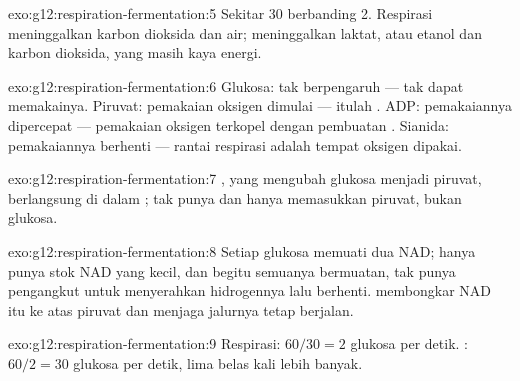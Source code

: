 \begin{solution}{exo:g12:respiration-fermentation:5}
Sekitar 30  berbanding 2. Respirasi meninggalkan karbon dioksida dan
air;  meninggalkan laktat, atau etanol dan karbon dioksida,
yang masih kaya energi.
\end{solution}

\begin{solution}{exo:g12:respiration-fermentation:6}
Glukosa: tak berpengaruh ---  tak dapat memakainya.
Piruvat: pemakaian oksigen dimulai --- itulah  .
ADP: pemakaiannya dipercepat --- pemakaian oksigen terkopel dengan
pembuatan . Sianida: pemakaiannya berhenti --- rantai respirasi
adalah tempat oksigen dipakai.
\end{solution}

\begin{solution}{exo:g12:respiration-fermentation:7}
, yang mengubah glukosa menjadi piruvat, berlangsung di
dalam ;  tak punya  dan hanya memasukkan
piruvat, bukan glukosa.
\end{solution}

\begin{solution}{exo:g12:respiration-fermentation:8}
Setiap glukosa memuati dua NAD;  hanya punya stok NAD yang kecil,
dan begitu semuanya bermuatan,  tak punya pengangkut untuk
menyerahkan hidrogennya lalu berhenti.  membongkar NAD itu
ke atas piruvat dan menjaga jalurnya tetap berjalan.
\end{solution}

\begin{solution}{exo:g12:respiration-fermentation:9}
Respirasi: $60/30 = 2$ glukosa per detik. : $60/2 = 30$
glukosa per detik, lima belas kali lebih banyak.
\end{solution}

